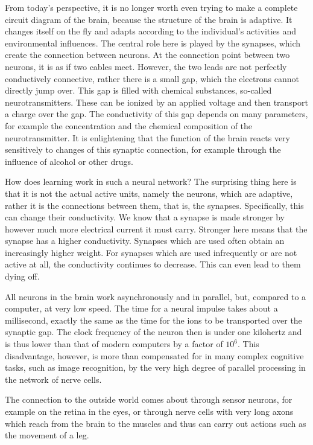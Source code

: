 \documentclass[10pt]{book}
\begin{document}
From today's perspective, it is no longer worth even trying to make a complete circuit diagram of the brain, because the structure of the brain is adaptive. It changes itself on the fly and adapts according to the individual's activities and environmental influences. The central role here is played by the synapses, which create the connection between neurons. At the connection point between two neurons, it is as if two cables meet. However, the two leads are not perfectly conductively connective, rather there is a small gap, which the electrons cannot directly jump over. This gap is filled with chemical substances, so-called neurotransmitters. These can be ionized by an applied voltage and then transport a charge over the gap. The conductivity of this gap depends on many parameters, for example the concentration and the chemical composition of the neurotransmitter. It is enlightening that the function of the brain reacts very sensitively to changes of this synaptic connection, for example through the influence of alcohol or other drugs.

How does learning work in such a neural network? The surprising thing here is that it is not the actual active units, namely the neurons, which are adaptive, rather it is the connections between them, that is, the synapses. Specifically, this can change their conductivity. We know that a synapse is made stronger by however much more electrical current it must carry. Stronger here means that the synapse has a higher conductivity. Synapses which are used often obtain an increasingly higher weight. For synapses which are used infrequently or are not active at all, the conductivity continues to decrease. This can even lead to them dying off.

All neurons in the brain work asynchronously and in parallel, but, compared to a computer, at very low speed. The time for a neural impulse takes about a millisecond, exactly the same as the time for the ions to be transported over the synaptic gap. The clock frequency of the neuron then is under one kilohertz and is thus lower than that of modern computers by a factor of $10^{6}$. This disadvantage, however, is more than compensated for in many complex cognitive tasks, such as image recognition, by the very high degree of parallel processing in the network of nerve cells.

The connection to the outside world comes about through sensor neurons, for example on the retina in the eyes, or through nerve cells with very long axons which reach from the brain to the muscles and thus can carry out actions such as the movement of a leg.
\end{document}

